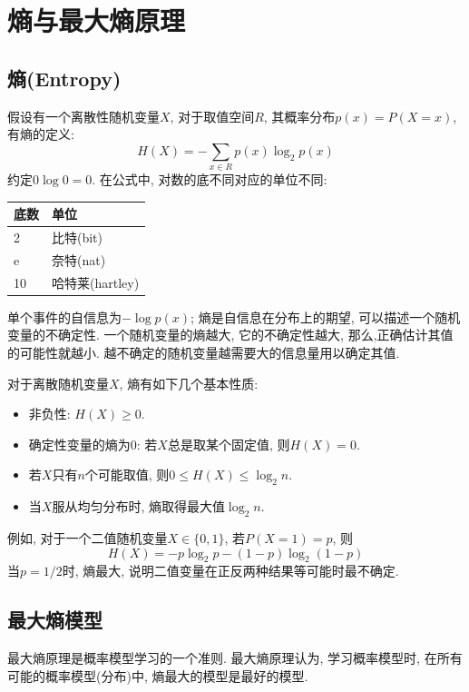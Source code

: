 \chapter{熵与最大熵原理}


\section{熵(Entropy)}


假设有一个离散性随机变量$X$, 对于取值空间$R$, 其概率分布$p(x)=P(X=x)$, 有熵的定义:
\[
H(X) = - \sum_{x \in R} p(x) \log_2 p(x)
\]
约定$0 \log 0 = 0$. 在公式中, 对数的底不同对应的单位不同:
\begin{table}[H]
\centering
\begingroup
\setlength{\tabcolsep}{2pt}
\small
\begin{tabular}{|p{}|p{}|}
\hline
底数 & 单位 \\ \hline
2 & 比特(bit) \\ \hline
e & 奈特(nat) \\ \hline
10 & 哈特莱(hartley) \\ \hline
\end{tabular}
\endgroup
\end{table}
单个事件的自信息为$-\log p(x)$; 熵是自信息在分布上的期望, 可以描述一个随机变量的不确定性.
一个随机变量的熵越大, 它的不确定性越大, 那么,正确估计其值的可能性就越小.
越不确定的随机变量越需要大的信息量用以确定其值.

对于离散随机变量$X$, 熵有如下几个基本性质:

\begin{itemize}
\item 非负性: $H(X) \ge 0$.
\item 确定性变量的熵为$0$: 若$X$总是取某个固定值, 则$H(X)=0$.
\item 若$X$只有$n$个可能取值, 则$0 \le H(X) \le \log_2 n$.
\item 当$X$服从均匀分布时, 熵取得最大值$\log_2 n$.
\end{itemize}

例如, 对于一个二值随机变量$X \in \{0,1\}$, 若$P(X=1)=p$, 则
\[
H(X) = - p \log_2 p - (1-p) \log_2 (1-p)
\]
当$p=1/2$时, 熵最大, 说明二值变量在正反两种结果等可能时最不确定.

\section{最大熵模型}


最大熵原理是概率模型学习的一个准则. 最大熵原理认为, 学习概率模型时, 在所有可能的概率模型(分布)中, 熵最大的模型是最好的模型.

